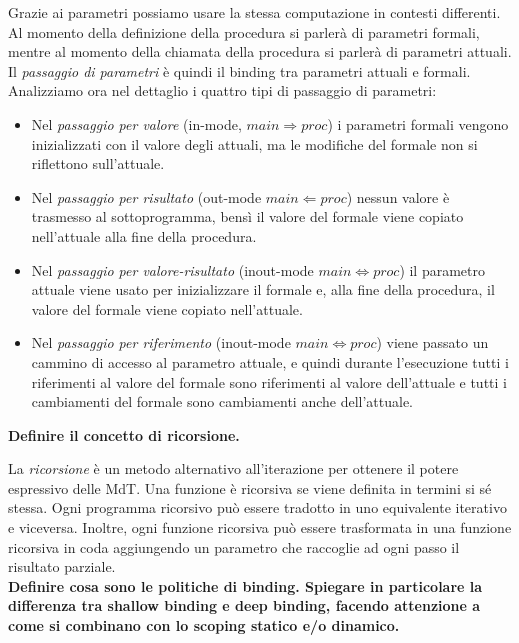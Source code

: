 \documentclass[a4paper,oneside,titlepage]{book}
\begin{document}
Grazie ai parametri possiamo usare la stessa computazione in contesti differenti. Al momento della definizione della procedura si parlerà di parametri formali, mentre al momento della chiamata della procedura si parlerà di parametri attuali. Il \emph{passaggio di parametri} è quindi il binding tra parametri attuali e formali. Analizziamo ora nel dettaglio i quattro tipi di passaggio di parametri:
\begin{itemize}
	\item Nel \emph{passaggio per valore} (in-mode, $main \Rightarrow proc$) i parametri formali vengono inizializzati con il valore degli attuali, ma le modifiche del formale non si riflettono sull'attuale.
	
	\item Nel \emph{passaggio per risultato} (out-mode $main \Leftarrow proc$) nessun valore è trasmesso al sottoprogramma, bensì il valore del formale viene copiato nell'attuale alla fine della procedura.
	
	\item Nel \emph{passaggio per valore-risultato} (inout-mode $main \Leftrightarrow proc$) il parametro attuale viene usato per inizializzare il formale e, alla fine della procedura, il valore del formale viene copiato nell'attuale.
	
	\item Nel \emph{passaggio per riferimento} (inout-mode $main \Leftrightarrow proc$) viene passato un cammino di accesso al parametro attuale, e quindi durante l'esecuzione tutti i riferimenti al valore del formale sono riferimenti al valore dell'attuale e tutti i cambiamenti del formale sono cambiamenti anche dell'attuale.
\end{itemize}
\noindent
\textbf{Definire il concetto di ricorsione.}

La \emph{ricorsione} è un metodo alternativo all'iterazione per ottenere il potere espressivo delle MdT. Una funzione è ricorsiva se viene definita in termini si sé stessa. Ogni programma ricorsivo può essere tradotto in uno equivalente iterativo e viceversa. Inoltre, ogni funzione ricorsiva può essere trasformata in una funzione ricorsiva in coda aggiungendo un parametro che raccoglie ad ogni passo il risultato parziale.
\bigskip
\\
\textbf{Definire cosa sono le politiche di binding. Spiegare in particolare la differenza tra shallow binding e deep binding, facendo attenzione a come si combinano con lo scoping statico e/o dinamico.}
\end{document}
